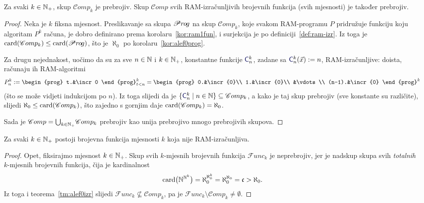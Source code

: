 \begin{teorem}[{name=[prebrojivost skupa $\mathscr Comp$]}]\label{tm:alef0izr}
Za svaki $k\in{\mathbb N}_+$, skup $\mathscr Comp_k$ je prebrojiv. Skup $\mathscr Comp$ svih RAM-izračunljivih brojevnih funkcija (svih mjesnosti) je također prebrojiv.
\end{teorem}
\begin{proof}
Neka je $k$ fiksna mjesnost. Preslikavanje
	sa skupa $\mathscr Pr\mspace{-1mu}o\mspace{-2mu}g$ na skup $\mathscr Comp_k$,
	koje svakom RAM-programu $P$ pridružuje funkciju koju algoritam $P^k$ računa, je dobro definirano prema korolaru~\ref{kor:ram1fun}, i surjekcija je po definiciji~\ref{def:ram-izr}. Iz toga je $\operatorname{card}(\mathscr Comp_k)\le\operatorname{card}(\mathscr Pr\mspace{-1mu}o\mspace{-2mu}g)$, što je $\aleph_0$ po korolaru~\ref{kor:alef0prog}.

Za drugu nejednakost, uočimo da su za sve $n\in{\mathbb N}$ i $k\in{\mathbb N}_+$, konstantne funkcije $\f{C}_n^k$, zadane sa
$\f{C}_n^k(\vec x):=n$, RAM-izračunljive: doista, računaju ih RAM-algoritmi
\begin{equation}\label{eq:konstRAM}
    P_n^k:=\begin{prog}
    t.&\incr0
    \end{prog}_{t<n}^k=\begin{prog}
    0.&\incr{0}\\
    1.&\incr{0}\\
    &\vdots\\
    (n-1).&\incr{0}
    \end{prog}^k
\end{equation}
(što se može vidjeti indukcijom po $n$).
Iz toga slijedi da je $\{\f{C}_n^k\mid n\in\N\}\subseteq\mathscr Comp_k$, a kako je taj skup prebrojiv (sve konstante su različite), slijedi $\aleph_0\le\operatorname{card}(\mathscr Comp_k)$, što zajedno s gornjim daje $\operatorname{card}(\mathscr Comp_k)=\aleph_0$.

Sada je $\mathscr Comp=\bigcup_{k\in{\mathbb N}_+}\!\mathscr Comp_k$ prebrojiv kao unija prebrojivo mnogo prebrojivih skupova.
\end{proof}

\begin{korolar}[{name=[postojanje ne-RAM-izračunljivih funkcija]}]\label{kor:exneizrk}
Za svaki $k\in{\mathbb N}_+$ postoji brojevna funkcija mjesnosti $k$ koja nije RAM-izračunljiva.
\end{korolar}
\begin{proof}
Opet, fiksirajmo mjesnost $k\in{\mathbb N}_+$. Skup svih $k$-mjesnih brojevnih funkcija $\mathscr Func_k$ je neprebrojiv, jer je nadskup skupa svih \emph{totalnih} $k$-mjesnih brojevnih funkcija, čija je kardinalnost
\begin{equation}
    \operatorname{card}\bigl({\mathbb N}^{{\mathbb N}^k}\bigr)=\aleph_0^{\aleph_0^k}=\aleph_0^{\aleph_0}=\mathfrak c>\aleph_0\text.
\end{equation}
    Iz toga i teorema~\ref{tm:alef0izr} slijedi $\mathscr Func_k\nsubseteq\mathscr Comp_k$, pa je $\mathscr Func_k\!\setminus\mathscr Comp_k\ne\emptyset$.
\end{proof}

